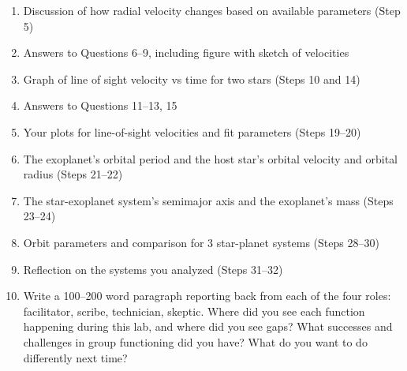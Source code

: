 \begin{enumerate}
	\item Discussion of how radial velocity changes based on available parameters (Step 5)
	\item Answers to Questions 6--9, including figure with sketch of velocities
	\item Graph of line of sight velocity vs time for two stars (Steps 10 and 14)
	\item Answers to Questions 11--13, 15
	\item Your plots for line-of-sight velocities and fit parameters (Steps 19--20)
	\item The exoplanet's orbital period and the host star's orbital velocity and orbital radius (Steps 21--22)
	\item The star-exoplanet system's semimajor axis and the exoplanet's mass (Steps 23--24)
	\item Orbit parameters and comparison for 3 star-planet systems (Steps 28--30)
	\item Reflection on the systems you analyzed (Steps 31--32)
	\item Write a 100--200 word paragraph reporting back from each of the four roles: facilitator, scribe, technician, skeptic. Where did you see each function happening during this lab, and where did you see gaps? What successes and challenges in group functioning did you have? What do you want to do differently next time?
\end{enumerate}

